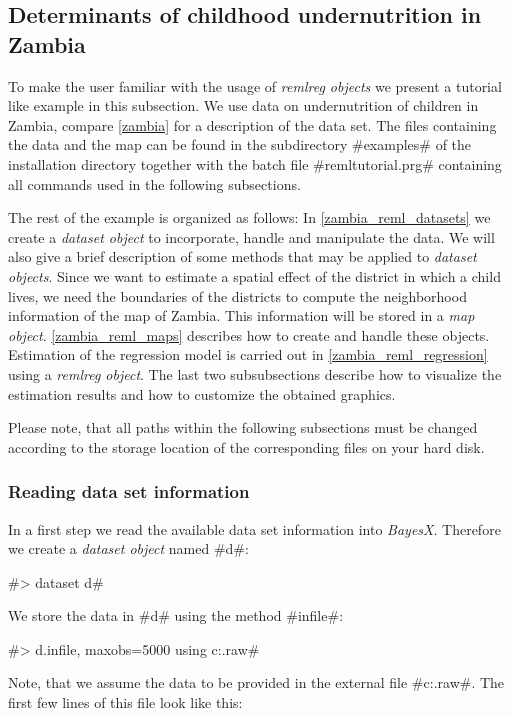 \subsection{Determinants of childhood undernutrition in Zambia}
\label{remlregzambianalysis}

To make the user familiar with the usage of {\em remlreg objects}
we present a tutorial like example in this subsection. We use data
on undernutrition of children in Zambia, compare \autoref{zambia}
for a description of the data set. The files containing the data
and the map can be found in the subdirectory #examples# of the
installation directory together with the batch file
#remltutorial.prg# containing all commands used in the following
subsections.

The rest of the example is organized as follows: In
\autoref{zambia_reml_datasets} we create a {\em dataset object} to
incorporate, handle and manipulate the data. We will also give a
brief description of some methods that may be applied to {\em
dataset objects}. Since we want to estimate a spatial effect of
the district in which a child lives, we need the boundaries of the
districts to compute the neighborhood information of the map of
Zambia. This information will be stored in a {\em map object}.
\autoref{zambia_reml_maps} describes how to create
and handle these objects. Estimation of the regression model is
carried out in \autoref{zambia_reml_regression} using a {\em
remlreg object}. The last two subsubsections describe how to
visualize the estimation results and how to customize the obtained
graphics.

Please note, that all paths within the following subsections must
be changed according to the storage location of the corresponding
files on your hard disk.

\subsubsection{Reading data set information}\label{zambia_reml_datasets}

In a first step we read the available data set information into
{\it BayesX}. Therefore we create a {\it dataset object} named
#d#:

#> dataset d#

We store the data in #d# using the method #infile#:

#> d.infile, maxobs=5000 using c:\data\zambia.raw#

Note, that we assume the data to be provided in the external file
#c:\data\zambia.raw#. The first few lines of this file look like
this:

